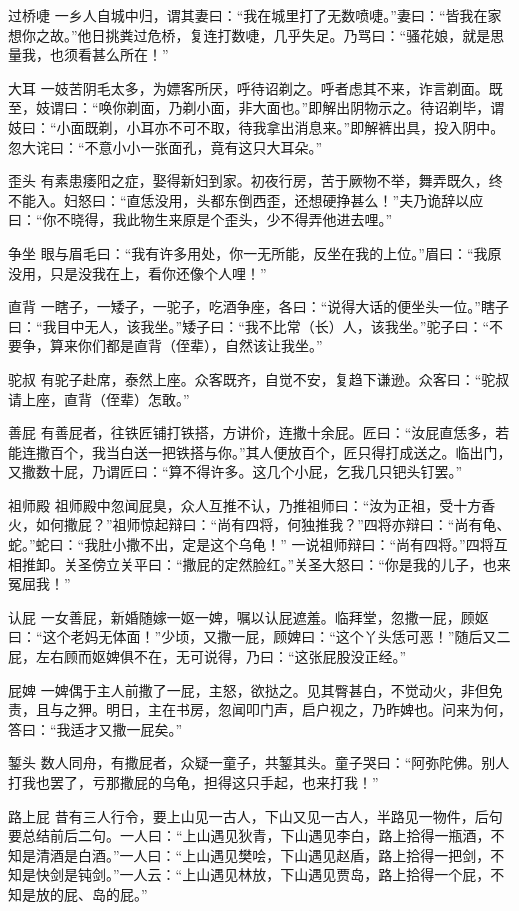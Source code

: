 \documentclass[12pt,UTF8]{ctexbook}
\begin{document}
过桥啑
一乡人自城中归，谓其妻曰：“我在城里打了无数喷啑。”妻曰：“皆我在家想你之故。”他日挑粪过危桥，复连打数啑，几乎失足。乃骂曰：“骚花娘，就是思量我，也须看甚么所在！”

大耳
一妓苦阴毛太多，为嫖客所厌，呼待诏剃之。呼者虑其不来，诈言剃面。既至，妓谓曰：“唤你剃面，乃剃小面，非大面也。”即解出阴物示之。待诏剃毕，谓妓曰：“小面既剃，小耳亦不可不取，待我拿出消息来。”即解裤出具，投入阴中。忽大诧曰：“不意小小一张面孔，竟有这只大耳朵。”

歪头
有素患痿阳之症，娶得新妇到家。初夜行房，苦于厥物不举，舞弄既久，终不能入。妇怒曰：“直恁没用，头都东倒西歪，还想硬挣甚么！”夫乃诡辞以应曰：“你不晓得，我此物生来原是个歪头，少不得弄他进去哩。”

争坐
眼与眉毛曰：“我有许多用处，你一无所能，反坐在我的上位。”眉曰：“我原没用，只是没我在上，看你还像个人哩！”

直背
一瞎子，一矮子，一驼子，吃酒争座，各曰：“说得大话的便坐头一位。”瞎子曰：“我目中无人，该我坐。”矮子曰：“我不比常（长）人，该我坐。”驼子曰：“不要争，算来你们都是直背（侄辈），自然该让我坐。”

驼叔
有驼子赴席，泰然上座。众客既齐，自觉不安，复趋下谦逊。众客曰：“驼叔请上座，直背（侄辈）怎敢。”

善屁
有善屁者，往铁匠铺打铁搭，方讲价，连撒十余屁。匠曰：“汝屁直恁多，若能连撒百个，我当白送一把铁搭与你。”其人便放百个，匠只得打成送之。临出门，又撒数十屁，乃谓匠曰：“算不得许多。这几个小屁，乞我几只钯头钉罢。”

祖师殿
祖师殿中忽闻屁臭，众人互推不认，乃推祖师曰：“汝为正祖，受十方香火，如何撒屁？”祖师惊起辩曰：“尚有四将，何独推我？”四将亦辩曰：“尚有龟、蛇。”蛇曰：“我肚小撒不出，定是这个乌龟！”
一说祖师辩曰：“尚有四将。”四将互相推卸。关圣傍立关平曰：“撒屁的定然脸红。”关圣大怒曰：“你是我的儿子，也来冤屈我！”

认屁
一女善屁，新婚随嫁一妪一婢，嘱以认屁遮羞。临拜堂，忽撒一屁，顾妪曰：“这个老妈无体面！”少顷，又撒一屁，顾婢曰：“这个丫头恁可恶！”随后又二屁，左右顾而妪婢俱不在，无可说得，乃曰：“这张屁股没正经。”

屁婢
一婢偶于主人前撒了一屁，主怒，欲挞之。见其臀甚白，不觉动火，非但免责，且与之狎。明日，主在书房，忽闻叩门声，启户视之，乃昨婢也。问来为何，答曰：“我适才又撒一屁矣。”

錾头
数人同舟，有撒屁者，众疑一童子，共錾其头。童子哭曰：“阿弥陀佛。别人打我也罢了，亏那撒屁的乌龟，担得这只手起，也来打我！”

路上屁
昔有三人行令，要上山见一古人，下山又见一古人，半路见一物件，后句要总结前后二句。一人曰：“上山遇见狄青，下山遇见李白，路上拾得一瓶酒，不知是清酒是白酒。”一人曰：“上山遇见樊哙，下山遇见赵盾，路上拾得一把剑，不知是快剑是钝剑。”一人云：“上山遇见林放，下山遇见贾岛，路上拾得一个屁，不知是放的屁、岛的屁。”
\end{document}
